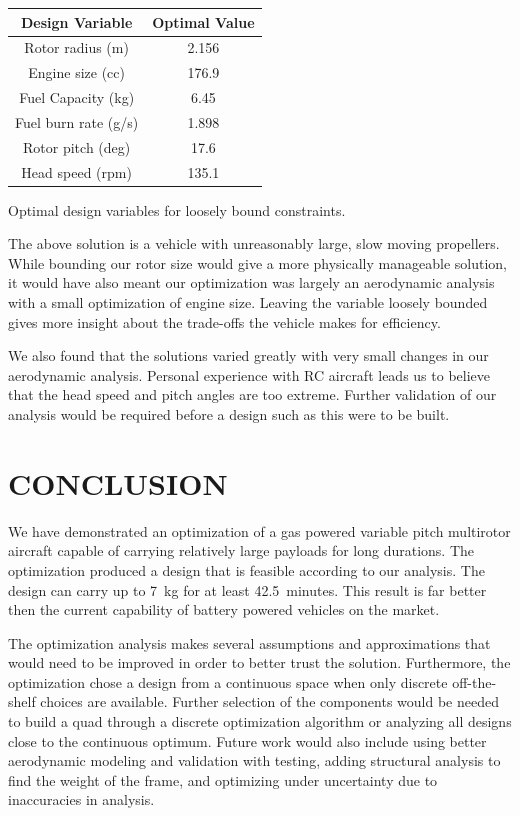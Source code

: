 \documentclass[letterpaper, 10 pt, conference]{ieeeconf}  %
\makeatletter
\newenvironment{tablehere}
  {\def\@captype{table}}
  {}
\makeatother
\begin{document}
\begin{tablehere}
\centering
\vspace{5mm}
	\begin{tabulary}{0.5\textwidth}{|C|C|}
		\hline
		Design Variable & Optimal Value \\ \hline \hline
		Rotor radius (m) & 2.156 \\ \hline
		Engine size (cc) & 176.9 \\ \hline
		Fuel Capacity (kg) & 6.45 \\ \hline
		Fuel burn rate (g/s) & 1.898 \\ \hline
		Rotor pitch (deg) & 17.6 \\ \hline
		Head speed (rpm) & 135.1 \\ \hline
	\end{tabulary}
\caption{Optimal design variables for loosely bound constraints.}
\label{table:unbound_results}
\end{tablehere}

The above solution is a vehicle with unreasonably large, slow moving propellers. While bounding our rotor size would give a more physically manageable solution, it would have also meant our optimization was largely an aerodynamic analysis with a small optimization of engine size. Leaving the variable loosely bounded gives more insight about the trade-offs the vehicle makes for efficiency. 

We also found that the solutions varied greatly with very small changes in our aerodynamic analysis. Personal experience with RC aircraft leads us to believe that the head speed and pitch angles are too extreme. Further validation of our analysis would be required before a design such as this were to be built.  



\section{CONCLUSION}

We have demonstrated an optimization of a gas powered variable pitch multirotor aircraft capable of carrying relatively large payloads for long durations.  The optimization produced a design that is feasible according to our analysis.  The design can carry up to 7~kg for at least 42.5~minutes.  This result is far better then the current capability of battery powered vehicles on the market.

The optimization analysis makes several assumptions and approximations that would need to be improved in order to better trust the solution.  Furthermore, the optimization chose a design from a continuous space when only discrete off-the-shelf choices are available. Further selection of the components would be needed to build a quad through a discrete optimization algorithm or analyzing all designs close to the continuous optimum. Future work would also include using better aerodynamic modeling and validation with testing, adding structural analysis to find the weight of the frame, and optimizing under uncertainty due to inaccuracies in analysis. 
\end{document}
